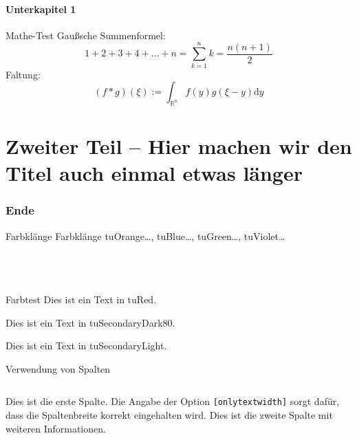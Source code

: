 \documentclass[fleqn,11pt,aspectratio=169]{beamer}
\begin{document}
\subsection{Unterkapitel 1}


\begin{frame}{Mathe-Test}
  Gaußsche Summenformel:
  \[1 + 2 + 3 + 4 + \ldots + n = \sum_{k=1}^n k = \frac{n(n+1)}{2}\]
  Faltung:
  \[(f*g)(\xi) := \int_{\mathbb{R}^n} f(y)g(\xi-y)\mathrm{d}y\]
\end{frame}


\part{Zweiter Teil -- Hier machen wir den Titel auch einmal etwas länger}


\begin{frame}
  \partpage
\end{frame}


\section{Ende}


\begin{frame}{Farbklänge}\small
  Farbklänge tuOrange\ldots, tuBlue\ldots, tuGreen\ldots, tuViolet\ldots\\\tiny
  ~\\
  ~\\
  ~\\
\end{frame}


\begin{frame}{Farbtest}
  \color{tuRed}
  Dies ist ein Text in tuRed.

  \color{tuSecondaryDark80}
  Dies ist ein Text in tuSecondaryDark80.

  \color{tuSecondaryLight}
  Dies ist ein Text in tuSecondaryLight.
\end{frame}

\begin{frame}{Verwendung von Spalten}
  \begin{columns}[onlytextwidth]
      Dies ist die erste Spalte.
      Die Angabe der Option \texttt{[onlytextwidth]}
      sorgt dafür, dass die Spaltenbreite korrekt eingehalten wird.
      Dies ist die zweite Spalte mit weiteren Informationen.
  \end{columns}
\end{frame}
\end{document}
